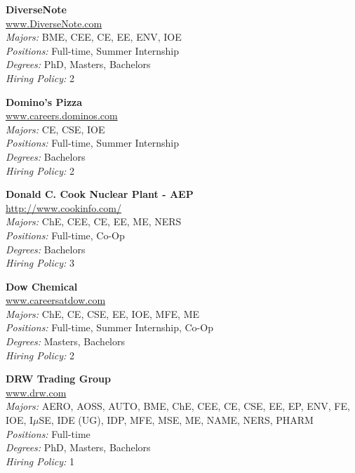 \documentclass[twoside]{article}
\begin{document}
\begin{center}
\begin{multicols}{3}
\begin{minipage}{.9\columnwidth}{\Large\bf DiverseNote }\\
	\url{www.DiverseNote.com}\\
	\emph{Majors:} BME, CEE, CE, EE, ENV, IOE\\
	\emph{Positions:} Full-time, Summer Internship\\
	\emph{Degrees:} PhD, Masters, Bachelors\\
	\emph{Hiring Policy:} 2\\
\end{minipage}
 
\begin{minipage}{.9\columnwidth}{\Large\bf Domino's Pizza }\\
	\url{www.careers.dominos.com}\\
	\emph{Majors:} CE, CSE, IOE\\
	\emph{Positions:} Full-time, Summer Internship\\
	\emph{Degrees:} Bachelors\\
	\emph{Hiring Policy:} 2\\
\end{minipage}
 
\begin{minipage}{.9\columnwidth}{\Large\bf Donald C. Cook Nuclear Plant - AEP }\\
	\url{http://www.cookinfo.com/}\\
	\emph{Majors:} ChE, CEE, CE, EE, ME, NERS\\
	\emph{Positions:} Full-time, Co-Op\\
	\emph{Degrees:} Bachelors\\
	\emph{Hiring Policy:} 3\\
\end{minipage}
 
\begin{minipage}{.9\columnwidth}{\Large\bf Dow Chemical }\\
	\url{www.careersatdow.com}\\
	\emph{Majors:} ChE, CE, CSE, EE, IOE, MFE, ME\\
	\emph{Positions:} Full-time, Summer Internship, Co-Op\\
	\emph{Degrees:} Masters, Bachelors\\
	\emph{Hiring Policy:} 2\\
\end{minipage}
 
\begin{minipage}{.9\columnwidth}{\Large\bf DRW Trading Group }\\
	\url{www.drw.com}\\
	\emph{Majors:} AERO, AOSS, AUTO, BME, ChE, CEE, CE, CSE, EE, EP, ENV, FE, IOE, I$\mu$SE, IDE (UG), IDP, MFE, MSE, ME, NAME, NERS, PHARM\\
	\emph{Positions:} Full-time\\
	\emph{Degrees:} PhD, Masters, Bachelors\\
	\emph{Hiring Policy:} 1\\
\end{minipage}
 

\end{multicols}
\end{center}
\end{document}
